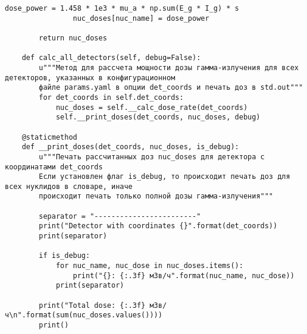 \begin{lstlisting}[caption=Исходный код модуля расчета мощности эквивалентной дозы внешнего гамма-излучения, 
                    label={lst_dose_calc}, basicstyle=\scriptsize]
                dose_power = 1.458 * 1e3 * mu_a * np.sum(E_g * I_g) * s
                nuc_doses[nuc_name] = dose_power

        return nuc_doses

    def calc_all_detectors(self, debug=False):
        u"""Метод для рассчета мощности дозы гамма-излучения для всех детекторов, указанных в конфигурационном
        файле params.yaml в опции det_coords и печать доз в std.out"""
        for det_coords in self.det_coords:
            nuc_doses = self.__calc_dose_rate(det_coords)
            self.__print_doses(det_coords, nuc_doses, debug)

    @staticmethod
    def __print_doses(det_coords, nuc_doses, is_debug):
        u"""Печать рассчитанных доз nuc_doses для детектора с координатами det_coords
        Если установлен флаг is_debug, то происходит печать доз для всех нуклидов в словаре, иначе
        происходит печать только полной дозы гамма-излучения"""

        separator = "------------------------"
        print("Detector with coordinates {}".format(det_coords))
        print(separator)

        if is_debug:
            for nuc_name, nuc_dose in nuc_doses.items():
                print("{}: {:.3f} мЗв/ч".format(nuc_name, nuc_dose))
            print(separator)

        print("Total dose: {:.3f} мЗв/ч\n".format(sum(nuc_doses.values())))
        print()

\end{lstlisting}


\clearpage